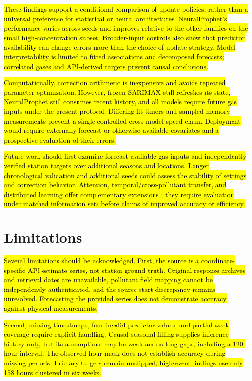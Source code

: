 \documentclass[pdflatex,sn-basic,Numbered]{sn-jnl}
\newcommand{\rev}[1]{\hl{#1}}
\begin{document}
\rev{These findings support a conditional comparison of update policies, rather than a universal preference for statistical or neural architectures. NeuralProphet's performance varies across seeds and improves relative to the other families on the small high-concentration subset. Broader-input controls also show that predictor availability can change errors more than the choice of update strategy. Model interpretability is limited to fitted associations and decomposed forecasts; correlated gases and API-derived targets prevent causal conclusions.}

\rev{Computationally, correction arithmetic is inexpensive and avoids repeated parameter optimization. However, frozen SARIMAX still refreshes its state, NeuralProphet still consumes recent history, and all models require future gas inputs under the present protocol. Differing fit timers and sampled memory measurements prevent a single controlled cross-model speed claim. Deployment would require externally forecast or otherwise available covariates and a prospective evaluation of their errors.}

\rev{Future work should first examine forecast-available gas inputs and independently verified station targets over additional seasons and locations. Longer chronological validation and additional seeds could assess the stability of settings and correction behavior. Attention, temporal/cross-pollutant transfer, and distributed learning offer complementary extensions \citep{revSTA,revWinter,revCrossPollutant,bib30}; they require evaluation under matched information sets before claims of improved accuracy or efficiency.}

\section{Limitations}

\rev{Several limitations should be acknowledged. First, the source is a coordinate-specific API estimate series, not station ground truth. Original response archives and retrieval dates are unavailable, pollutant field mapping cannot be independently authenticated, and the source-start discrepancy remains unresolved. Forecasting the provided series does not demonstrate accuracy against physical measurements.}

\rev{Second, missing timestamps, four invalid predictor values, and partial-week coverage require explicit handling. Causal seasonal filling supplies inference history only, but its assumptions may be weak across long gaps, including a 120-hour interval. The observed-hour mask does not establish accuracy during missing periods. Primary targets remain unclipped; high-event findings use only 158 hours clustered in six weeks.}
\end{document}

